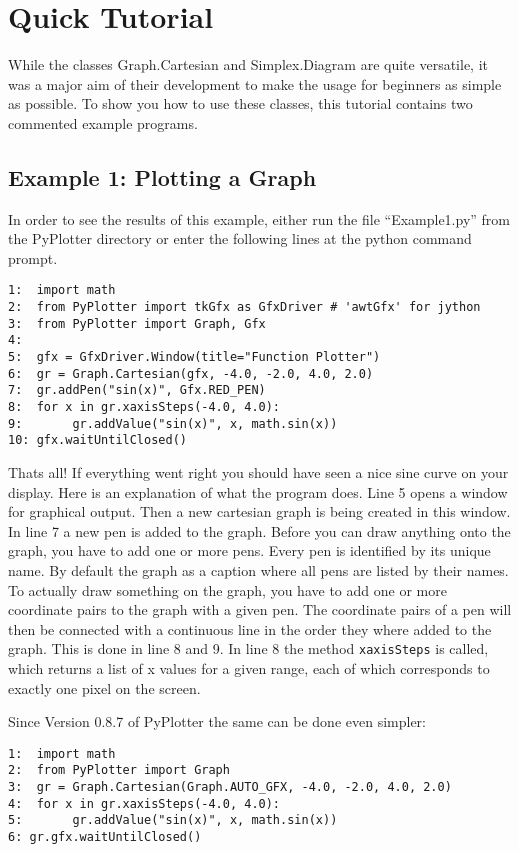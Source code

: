 \documentclass[12pt,a4paper,USenglish]{article}
\begin{document}
\section{Quick Tutorial}

While the classes Graph.Cartesian and Simplex.Diagram are quite
versatile, it was a major aim of their development to make the usage
for beginners as simple as possible. To show you how to use these
classes, this tutorial contains two commented example programs.

\subsection{Example 1: Plotting a Graph}

In order to see the results of this example, either run the file
``Example1.py'' from the {\sf PyPlotter} directory or enter the following
lines at the python command prompt.

\begin{verbatim}
1:  import math
2:  from PyPlotter import tkGfx as GfxDriver # 'awtGfx' for jython
3:  from PyPlotter import Graph, Gfx
4:    
5:  gfx = GfxDriver.Window(title="Function Plotter")   
6:  gr = Graph.Cartesian(gfx, -4.0, -2.0, 4.0, 2.0)    
7:  gr.addPen("sin(x)", Gfx.RED_PEN)
8:  for x in gr.xaxisSteps(-4.0, 4.0):
9:       gr.addValue("sin(x)", x, math.sin(x))
10: gfx.waitUntilClosed()
\end{verbatim}

Thats all! If everything went right you should have seen a nice sine
curve on your display. Here is an explanation of what the program
does. Line 5 opens a window for graphical output. Then a new cartesian
graph is being created in this window. In line 7 a new pen is added to
the graph. Before you can draw anything onto the graph, you have to
add one or more pens. Every pen is identified by its unique name. By
default the graph as a caption where all pens are listed by their
names. To actually draw something on the graph, you have to add one or
more coordinate pairs to the graph with a given pen. The coordinate
pairs of a pen will then be connected with a continuous line in the
order they where added to the graph. This is done in line 8 and 9.  In
line 8 the method {\tt xaxisSteps} is called, which returns a list of
x values for a given range, each of which corresponds to exactly one
pixel on the screen.

Since Version 0.8.7 of PyPlotter the same can be done even simpler:

\begin{verbatim}
1:  import math
2:  from PyPlotter import Graph 
3:  gr = Graph.Cartesian(Graph.AUTO_GFX, -4.0, -2.0, 4.0, 2.0)    
4:  for x in gr.xaxisSteps(-4.0, 4.0):
5:       gr.addValue("sin(x)", x, math.sin(x))
6: gr.gfx.waitUntilClosed()
\end{verbatim}
\end{document}
